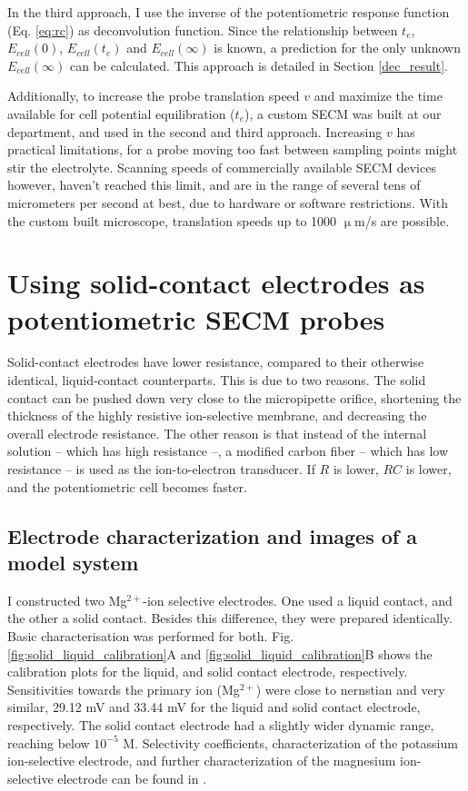 In the third approach, I use the inverse of the potentiometric response function (Eq. \ref{eq:rc}) as deconvolution function.
Since the relationship between $t_e$, $E_{cell}(0)$, $E_{cell}(t_e)$ and $E_{cell}(\infty)$ is known, a prediction for the only unknown $E_{cell}(\infty)$ can be calculated.
This approach is detailed in Section \ref{dec_result}.

Additionally, to increase the probe translation speed $v$ and maximize the time available for cell potential equilibration ($t_e$), a custom SECM was built at our department, and used in the second and third approach.
Increasing $v$ has practical limitations, for a probe moving too fast between sampling points might stir the electrolyte.
Scanning speeds of commercially available SECM devices however, haven't reached this limit, and are in the range of several tens of micrometers per second at best, due to hardware or software restrictions.
With the custom built microscope, translation speeds up to 1000 $\upmu$m/s are possible.

	\section{Using solid-contact electrodes as potentiometric SECM probes}
	\label{solid_result}
Solid-contact electrodes have lower resistance, compared to their otherwise identical, liquid-contact counterparts.
This is due to two reasons.
The solid contact can be pushed down very close to the micropipette orifice, shortening the thickness of the highly resistive ion-selective membrane, and decreasing the overall electrode resistance.
The other reason is that instead of the internal solution -- which has high resistance --, a modified carbon fiber -- which has low resistance -- is used as the ion-to-electron transducer.
If $R$ is lower, $RC$ is lower, and the potentiometric cell becomes faster.


		\subsection{Electrode characterization and images of a model system}
I constructed two Mg$^{2+}$-ion selective electrodes.
One used a liquid contact, and the other a solid contact.
Besides this difference, they were prepared identically.
Basic characterisation was performed for both.
Fig. \ref{fig:solid_liquid_calibration}A and \ref{fig:solid_liquid_calibration}B shows the calibration plots for the liquid, and solid contact electrode, respectively.
Sensitivities towards the primary ion (Mg$^{2+}$) were close to nernstian and very similar, 29.12 mV and 33.44 mV for the liquid and solid contact electrode, respectively.
The solid contact electrode had a slightly wider dynamic range, reaching below $10^{-5}$ M.
Selectivity coefficients, characterization of the potassium ion-selective electrode, and further characterization of the magnesium ion-selective electrode can be found in \cite{calugareanu2013ion}.

